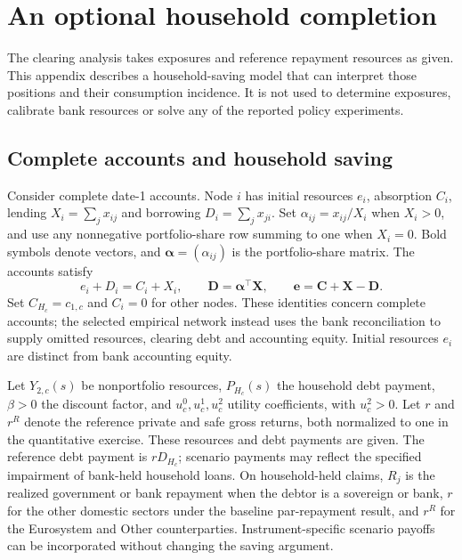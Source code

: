\section{An optional household completion}\label{app:household-completion}\label{app:calibration_implementation}

The clearing analysis takes exposures and reference repayment resources as given. This appendix describes a household-saving model that can interpret those positions and their consumption incidence. It is not used to determine exposures, calibrate bank resources or solve any of the reported policy experiments.

\subsection{Complete accounts and household saving}\label{sec:model_households}

Consider complete date-1 accounts. Node $i$ has initial resources $e_i$, absorption $C_i$, lending $X_i=\sum_jx_{ij}$ and borrowing $D_i=\sum_jx_{ji}$. Set $\alpha_{ij}=x_{ij}/X_i$ when $X_i>0$, and use any nonnegative portfolio-share row summing to one when $X_i=0$. Bold symbols denote vectors, and $\boldsymbol\alpha=(\alpha_{ij})$ is the portfolio-share matrix. The accounts satisfy
\[
 e_i+D_i=C_i+X_i,\qquad
 \mathbf D=\boldsymbol\alpha^\top\mathbf X,
 \qquad \mathbf e=\mathbf C+\mathbf X-\mathbf D.
\]
Set $C_{H_c}=c_{1,c}$ and $C_i=0$ for other nodes. These identities concern complete accounts; the selected empirical network instead uses the bank reconciliation to supply omitted resources, clearing debt and accounting equity. Initial resources $e_i$ are distinct from bank accounting equity.

Let $Y_{2,c}(s)$ be nonportfolio resources, $P_{H_c}(s)$ the household debt payment, $\beta>0$ the discount factor, and $u_c^0,u_c^1,u_c^2$ utility coefficients, with $u_c^2>0$. Let $r$ and $r^R$ denote the reference private and safe gross returns, both normalized to one in the quantitative exercise. These resources and debt payments are given. The reference debt payment is $rD_{H_c}$; scenario payments may reflect the specified impairment of bank-held household loans. On household-held claims, $R_j$ is the realized government or bank repayment when the debtor is a sovereign or bank, $r$ for the other domestic sectors under the baseline par-repayment result, and $r^R$ for the Eurosystem and Other counterparties. Instrument-specific scenario payoffs can be incorporated without changing the saving argument.

